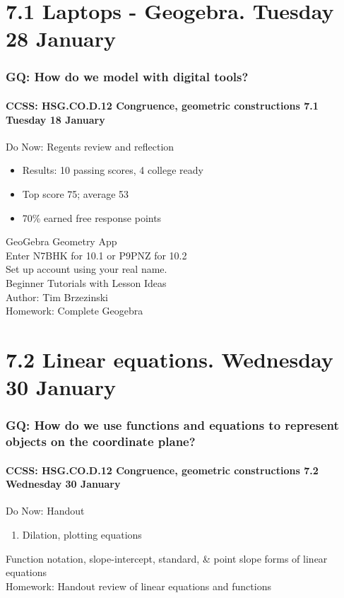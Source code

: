 \documentclass{beamer}
\begin{document}
\section{7.1 Laptops - Geogebra. Tuesday 28 January}
  \frame
  {
    \frametitle{GQ: How do we model with digital tools?}
    \framesubtitle{CCSS: HSG.CO.D.12 Congruence, geometric constructions  \alert{7.1 Tuesday 18 January}}

    \begin{block}{Do Now: Regents review and reflection}
      \begin{itemize}
        \item Results: 10 passing scores, 4 college ready
        \item Top score 75; average 53
        \item 70\% earned free response points
      \end{itemize}
    \end{block}
    GeoGebra Geometry App\\
    Enter \alert{N7BHK} for 10.1 or \alert{P9PNZ} for 10.2\\
    Set up account using your real name.\\
    Beginner Tutorials with Lesson Ideas\\
    Author: Tim Brzezinski\\[0.5cm]
    Homework: Complete Geogebra
  }

\section{7.2 Linear equations. Wednesday 30 January}
  \frame
  {
    \frametitle{GQ: How do we use functions and equations to represent objects on the coordinate plane?}
    \framesubtitle{CCSS: HSG.CO.D.12 Congruence, geometric constructions  \alert{7.2 Wednesday 30 January}}

    \begin{block}{Do Now: Handout}
      \begin{enumerate}
        \item Dilation, plotting equations
      \end{enumerate}
    \end{block}
    Function notation, slope-intercept, standard, \& point slope forms of linear equations\\[0.5cm]
    Homework: Handout review of linear equations and functions
  }
\end{document}
